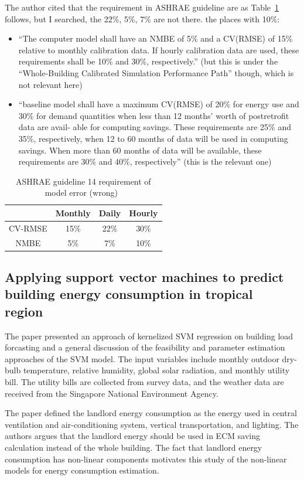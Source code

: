 \documentclass[12pt]{article}
\newcommand{\tref}[1]{Table~\ref{#1}}
\begin{document}
The author cited that the requirement in ASHRAE guideline are as
\tref{tab:modelerr} follows, but I searched, the 22\%, 5\%, 7\% are
not there.  the places with 10\%:
\begin{itemize}
\item ``The computer model shall have an NMBE of 5\% and a CV(RMSE) of
  15\% relative to monthly calibration data. If hourly calibration
  data are used, these requirements shall be 10\% and 30\%,
  respectively.'' (but this is under the ``Whole-Building Calibrated
  Simulation Performance Path'' though, which is not relevant here)
\item ``baseline model shall have a maximum CV(RMSE) of 20\% for
  energy use and 30\% for demand quantities when less than 12 months’
  worth of postretrofit data are avail- able for computing
  savings. These requirements are 25\% and 35\%, respectively, when 12
  to 60 months of data will be used in computing savings. When more
  than 60 months of data will be available, these requirements are
  30\% and 40\%, respectively'' (this is the relevant one)
\end{itemize}
\begin{table}[h!]
  \centering
  \begin{tabular}{c|c|c|c}
    \hline
    &Monthly &Daily &Hourly\\
    \hline
    \hline
    CV-RMSE&15\%&22\%&30\%\\
    \hline
    NMBE&5\%&7\%&10\%\\
    \hline
  \end{tabular}
  \caption{ASHRAE guideline 14 requirement of model error (wrong)~\cite{Zhang2015177}}
  \label{tab:modelerr}
\end{table}
\subsection{Applying support vector machines to predict building
energy consumption in tropical region~\cite{dong2005applying}}
The paper presented an approach of kernelized SVM regression on
building load forcasting and a general discussion of the feasibility
and parameter estimation approaches of the SVM model. The input
variables include monthly outdoor dry-bulb temperature, relative
humidity, global solar radiation, and monthly utility bill. The
utility bills are collected from survey data, and the weather data are
received from the Singapore National Environment Agency.

The paper defined the landlord energy consumption as the energy used
in central ventilation and air-conditioning system, vertical
transportation, and lighting. The authors argues that the landlord
energy should be used in ECM saving calculation instead of the whole
building. The fact that landlord energy consumption has non-linear
components motivates this study of the non-linear models for energy
consumption estimation.
\end{document}
